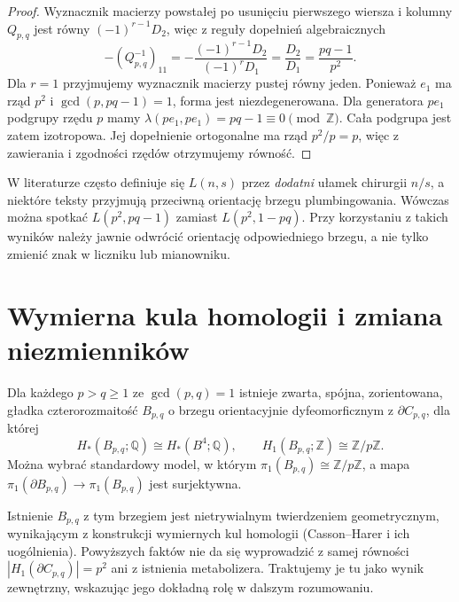 \begin{proof}
Wyznacznik macierzy powstałej po usunięciu pierwszego
wiersza i kolumny $Q_{p,q}$ jest równy
$(-1)^{r-1}D_2$, więc z reguły dopełnień algebraicznych
\[
-(Q_{p,q}^{-1})_{11}=
-\frac{(-1)^{r-1}D_2}{(-1)^rD_1}
=\frac{D_2}{D_1}=
\frac{pq-1}{p^2}.
\]
Dla $r=1$ przyjmujemy wyznacznik macierzy pustej równy jeden.
Ponieważ $e_1$ ma rząd $p^2$ i $\gcd(p,pq-1)=1$,
forma jest niezdegenerowana. Dla generatora $pe_1$ podgrupy
rzędu $p$ mamy
$\lambda(pe_1,pe_1)=pq-1\equiv0\pmod{\mathbb Z}$.
Cała podgrupa jest zatem izotropowa.
Jej dopełnienie ortogonalne ma rząd $p^2/p=p$,
więc z zawierania i zgodności rzędów otrzymujemy równość.
\end{proof}

\begin{uwaga}
W literaturze często definiuje się $L(n,s)$ przez
\emph{dodatni} ułamek chirurgii $n/s$, a niektóre teksty
przyjmują przeciwną orientację brzegu plumbingowania.
Wówczas można spotkać $L(p^2,pq-1)$ zamiast
$L(p^2,1-pq)$. Przy korzystaniu z takich wyników
należy jawnie odwrócić orientację odpowiedniego brzegu,
a nie tylko zmienić znak w liczniku lub mianowniku.
\end{uwaga}

\section{Wymierna kula homologii i zmiana niezmienników}
\label{sec:tg-general-operation}

\begin{twierdzenie}
\label{thm:tg-general-ball}
Dla każdego $p>q\geq1$ ze $\gcd(p,q)=1$ istnieje
zwarta, spójna, zorientowana, gładka czterorozmaitość
$B_{p,q}$ o brzegu orientacyjnie dyfeomorficznym z
$\partial C_{p,q}$, dla której
\[
H_*(B_{p,q};\mathbb Q)\cong H_*(B^4;\mathbb Q),
\qquad H_1(B_{p,q};\mathbb Z)\cong\mathbb Z/p\mathbb Z.
\]
Można wybrać standardowy model, w którym
$\pi_1(B_{p,q})\cong\mathbb Z/p\mathbb Z$, a mapa
$\pi_1(\partial B_{p,q})\to\pi_1(B_{p,q})$ jest surjektywna.
\end{twierdzenie}

\begin{uwaga}
Istnienie $B_{p,q}$ z tym brzegiem jest nietrywialnym
twierdzeniem geometrycznym, wynikającym z konstrukcji
wymiernych kul homologii (Casson--Harer i ich uogólnienia).
Powyższych faktów nie da się wyprowadzić z samej równości
$|H_1(\partial C_{p,q})|=p^2$ ani z istnienia metabolizera.
Traktujemy je tu jako wynik zewnętrzny, wskazując jego dokładną
rolę w dalszym rozumowaniu.
\end{uwaga}

